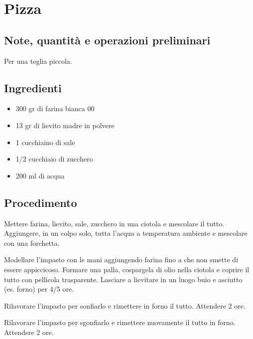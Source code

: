 \documentclass[12pt]{article}
\begin{document}
\newpage


\section{Pizza}

\subsection*{Note, quantità e operazioni preliminari}
Per una teglia piccola.

\bigskip
\bigskip

\begin{multicols}{2}
\subsection*{Ingredienti}
\begin{itemize}
	\item 300 gr di farina bianca 00
	\item 13 gr di lievito madre in polvere
	\item 1 cucchiaino di sale
	\item 1/2 cucchiaio di zucchero
	\item 200 ml di acqua
\end{itemize}

\vspace*{\fill}

\columnbreak
\subsection*{Procedimento}

Mettere farina, lievito, sale, zucchero in una ciotola e mescolare il tutto.
Aggiungere, in un colpo solo, tutta l'acqua a temperatura ambiente e mescolare con una forchetta.
\medskip

Modellare l'impasto con le mani aggiungendo farina fino a che non smette di essere appiccicoso.
Formare una palla, cospargela di olio nella ciotola e coprire il tutto con pellicola trasparente.
Lasciare a lievitare in un luogo buio e asciutto (es. forno) per 4/5 ore.
\medskip

Rilavorare l'impasto per sonfiarlo e rimettere in forno il tutto.
Attendere 2 ore.
\medskip

Rilavorare l'impasto per sgonfiarlo e rimettere nuovamente il tutto in forno.
Attendere 2 ore.
\medskip


\end{multicols}
\end{document}
